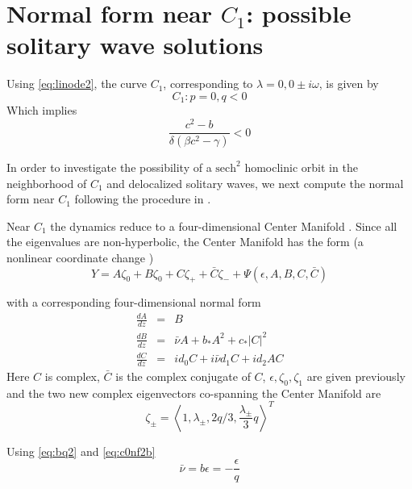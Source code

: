 \section{Normal form near $C_1$: possible solitary wave solutions}
Using \eqref{eq:linode2}, the curve $C_1$, corresponding to $\lambda = 0, 0\pm i \omega$, is given by
\begin{equation}\label{eq:ms_c1}
C_1 : { p = 0, q < 0 }
\end{equation}
Which implies
\begin{equation}
\frac{c^2 - b}{ \delta\left(\beta c^2 - \gamma \right)} < 0
\end{equation}

In order to investigate the possibility of a $ \mathrm{sech}^2 $  homoclinic orbit in
the neighborhood of $C_1$ and delocalized solitary waves, we next compute the
normal form near $C_1$ following the procedure in \cite{IA}.

Near $C_1$ the dynamics reduce to a four-dimensional Center Manifold \cite{IA}.
Since all the eigenvalues are non-hyperbolic, the Center Manifold has the form
(a nonlinear coordinate change \cite{IA})
\begin{equation} \label{eq:c1cm2}
Y = A \zeta_0 + B \zeta_0 + C \zeta_+ + \bar{C} \zeta_- + \Psi(\epsilon,A,B,C,\bar{C})
\end{equation}

with  a corresponding four-dimensional normal form
\begin{subequations}\label{eq:c1nf}
\begin{eqnarray}
\frac{dA}{dz} &=& B \label{eq:aq2} \\
\frac{dB}{dz} &=& \bar{\nu} A + b_* A^2 + c_* \left|C\right|^2  \label{eq:bq2} \\
\frac{dC}{dz} &=& i d_0 C + i \bar{\nu} d_1 C + i d_2 A C \label{eq:cq2}
\end{eqnarray}
\end{subequations}
Here $C$ is complex, $\bar{C}$ is the complex conjugate of $C$, $\epsilon,
\zeta_0, \zeta_1$ are given previously and the two new complex eigenvectors
co-spanning the Center Manifold are
\begin{equation}
\zeta_\pm	 = \left< 1, \lambda_\pm, 2 q / 3, \frac{\lambda_\pm}{3} q\right>^T 
\end{equation}

Using \eqref{eq:bq2} and \eqref{eq:c0nf2b}
\begin{equation}
\bar{\nu} = b \epsilon = -\frac{\epsilon}{q} 
\end{equation}

